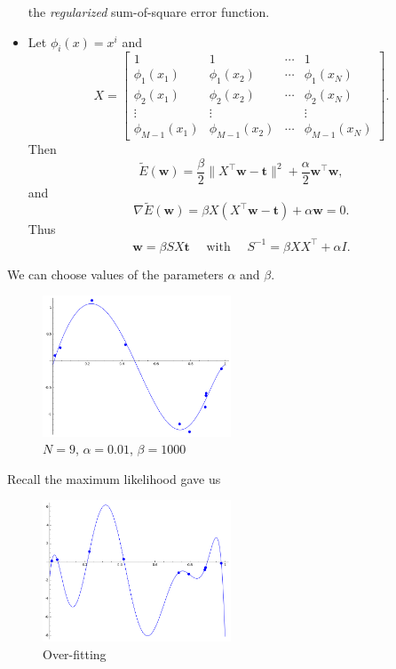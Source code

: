 \documentclass[
]{article}
\begin{document}
\begin{itemize}
  the \emph{regularized} sum-of-square error function.
\item
  Let \(\phi_i(x)=x^i\) and
  \[ X=\begin{bmatrix} 1 &1 & \cdots &1 \\ \phi_1(x_1) & \phi_1(x_2) & \cdots &\phi_1(x_N) \\ \phi_2(x_1) & \phi_2(x_2) & \cdots &\phi_2(x_N) \\ \vdots & \vdots & & \vdots \\ \phi_{M-1}(x_1) & \phi_{M-1}(x_2) & \cdots & \phi_{M-1}(x_N) \end{bmatrix} .\]
  Then
  \[ \tilde E({\boldsymbol{w}}) = \frac \beta 2 \lVert X^\top {\boldsymbol{w}}- \mathbf{t}\rVert^2 + \frac \alpha 2 {\boldsymbol{w}}^\top {\boldsymbol{w}},\]
  and
  \[ \nabla \tilde E({\boldsymbol{w}})= \beta X(X^\top {\boldsymbol{w}}- \mathbf{t}) +\alpha {\boldsymbol{w}}=0 . \]
  Thus
  \[ {\boldsymbol{w}}= \beta S X \mathbf{t}\quad \text{ with } \quad S^{-1}= \beta X X^\top + \alpha I . \]
\end{itemize}

We can choose values of the parameters \(\alpha\) and \(\beta\).

\begin{figure}
\hypertarget{fig:bcf}{%
\centering
\includegraphics[width=0.5\textwidth,height=\textheight]{bayesian-curve-fitting.png}
\caption{\(N=9\), \(\alpha=0.01\), \(\beta=1000\)}\label{fig:bcf}
}
\end{figure}

Recall the maximum likelihood gave us

\begin{figure}
\hypertarget{fig:f9}{%
\centering
\includegraphics[width=0.5\textwidth,height=\textheight]{f-9.png}
\caption{Over-fitting}\label{fig:f9}
}
\end{figure}
\end{document}
